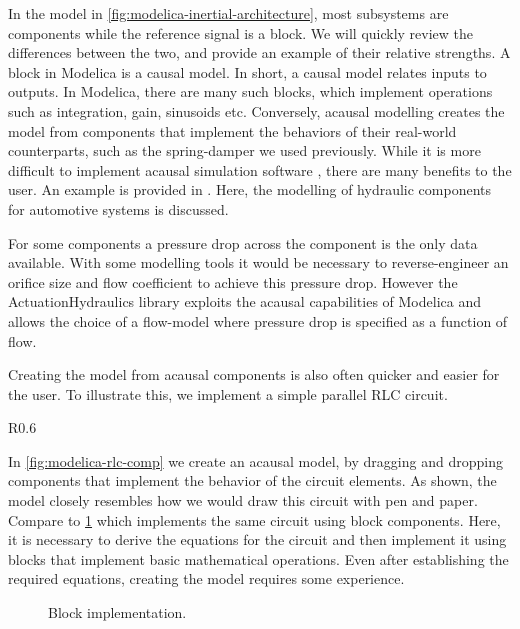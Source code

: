 \documentclass[\rootfolder/main.tex]{subfiles}
\begin{document}
In the model in \cref{fig:modelica-inertial-architecture}, most subsystems are components while the reference signal is a block.
We will quickly review the differences between the two, and provide an example of their relative strengths.
A block in Modelica is a causal model.
In short, a causal model relates inputs to outputs.
In Modelica, there are many such blocks, which implement operations such as integration, gain, sinusoids etc.
Conversely, acausal modelling creates the model from components that implement the behaviors of their real-world counterparts, such as the spring-damper we used previously.
While it is more difficult to implement acausal simulation software \cite{tiller2001}, there are many benefits to the user.
An example is provided in \cite{harman2006}.
Here, the modelling of hydraulic components for automotive systems is discussed.

\begin{displayquote}
    For some components a pressure drop across the component is the only data available.
    With some modelling tools it would be necessary to reverse-engineer an orifice size and flow coefficient to achieve this pressure drop.
    However the ActuationHydraulics library exploits the acausal capabilities of Modelica and allows the choice of a flow-model where pressure drop is specified as a function of flow.
\end{displayquote}

Creating the model from acausal components is also often quicker and easier for the user.
To illustrate this, we implement a simple parallel RLC circuit.

\begin{wrapfigure}{R}{0.6\columnwidth}
    \caption{Component implementation.\label{fig:modelica-rlc-comp}}
\end{wrapfigure}

In \cref{fig:modelica-rlc-comp} we create an acausal model, by dragging and dropping components that implement the behavior of the circuit elements.
As shown, the model closely resembles how we would draw this circuit with pen and paper.
Compare to \cref{fig:modelica-rlc-block} which implements the same circuit using block components.
Here, it is necessary to derive the equations for the circuit and then implement it using blocks that implement basic mathematical operations.
Even after establishing the required equations, creating the model requires some experience.

\begin{figure}[ht]
    \caption{Block implementation.\label{fig:modelica-rlc-block}}
\end{figure}
\end{document}
